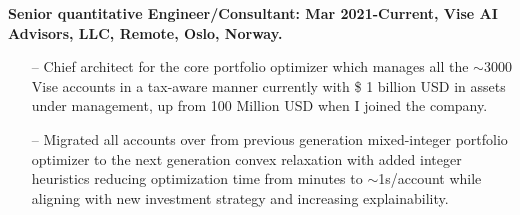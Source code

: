 \documentclass[letterpaper, 12pt]{article}
\renewenvironment{itemize}{
  \begin{list}{}{
    \setlength{\leftmargin}{1.5em}
  }
}{
  \end{list}
}
\begin{document}
\begin{itemize}
  \item \textbf{Senior quantitative Engineer/Consultant: Mar 2021-Current, Vise AI Advisors, LLC, Remote, Oslo, Norway. }
  \begin{enumerate}
       \item[--] Chief architect for the core portfolio optimizer which manages all the $\sim$3000 Vise accounts in a tax-aware manner currently with \$ 1 billion USD in assets under management, up from 100 Million USD when I joined the company. 
       \item[--] Migrated all accounts over from previous generation mixed-integer portfolio optimizer to the next generation convex relaxation with added integer heuristics reducing optimization time from minutes to $\sim$1s/account while aligning with new investment strategy and increasing explainability.
   \end{enumerate}
  

\end{itemize}
\end{document}
